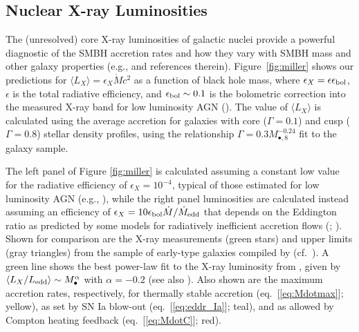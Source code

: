 \documentclass[usenatbib,fleqn]{mn2e}
\newcommand{\Mbh}[1][]{M_{\bullet#1}}
\newcommand{\Mbheight}{M_{\bullet,8}}
\begin{document}
\subsection{Nuclear X-ray Luminosities}
\label{sec:Lx}

The (unresolved) core X-ray luminosities of galactic nuclei provide a
powerful diagnostic of the SMBH accretion rates and how they vary with
SMBH mass and other galaxy properties (e.g., \citealt{Ho08} and
references therein).  Figure~\ref{fig:miller} shows our predictions
for $\langle L_{X} \rangle =\epsilon_X \dot{M} c^2$ as a function of
black hole mass, where $\epsilon_{X} = \epsilon\epsilon_{\rm bol}$,
$\epsilon$ is the total radiative efficiency, and $\epsilon_{\rm bol}
\sim 0.1$ is the bolometric correction into the measured X-ray band
for low luminosity AGN (\citealt{Ho08}).  The value of $\langle L_X
\rangle$ is calculated using the average accretion for galaxies with
core ($\Gamma = 0.1$) and cusp ($\Gamma = 0.8$) stellar density
profiles, using the relationship $\Gamma = 0.3 \Mbheight^{-0.24}$ fit
to the \citet{LauerFaber+:2007a} galaxy sample.

The left panel of Figure \ref{fig:miller} is calculated assuming a
constant low value for the radiative efficiency of $\epsilon_X = 10^{-4}$,
typical of those estimated for low luminosity AGN (e.g.,
\citealt{Ho:2009a}), while the right panel luminosities are calculated
instead assuming an efficiency of $\epsilon_X= 10 \epsilon_{\rm bol}\dot{M}/\dot{M}_{\rm
  edd}$ that depends on the Eddington ratio as predicted by some
models for radiatively inefficient accretion flows
(\citealt{Narayan&Yi95}; \citealt{Narayan+98}).  Shown for comparison
are the X-ray measurements (green stars) and upper limits (gray
triangles) from the sample of early-type galaxies compiled by \citet{Miller+15}
(cf.~\citealt{Gallo+10}).  A green line shows the best power-law fit
to the X-ray luminosity from \citet{Miller+15}, given by $\langle
L_X/L_{\rm edd}\rangle \sim \Mbh^\alpha$ with $\alpha = -0.2$ (see also
\citep{Zhang+09, Pellegrini10, Gallo+10}).  Also shown are the maximum accretion rates,
respectively, for thermally stable accretion (eq.~[\ref{eq:Mdotmax}]; yellow),
as set by SN Ia blow-out (eq.~[\ref{eq:eddr_Ia}]; teal), and as allowed by
Compton heating feedback (eq.~[\ref{eq:MdotC}]; red).
\end{document}
